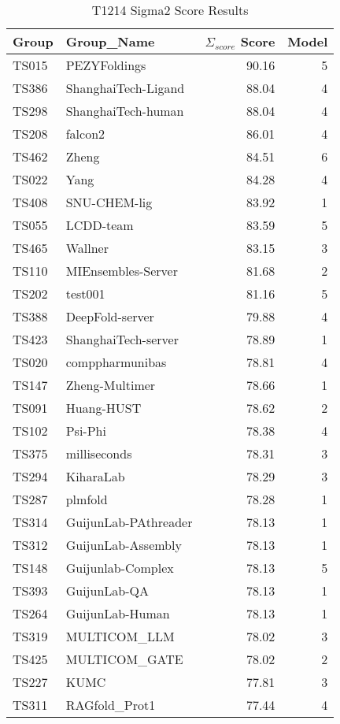 \begin{table*}[ht]
\caption{T1214 Sigma2 Score Results}
\label{tab:T1214_Sigma_score_split}
\scriptsize
\begin{minipage}[t]{0.48\textwidth}
\centering
\begin{tabular}{llrr}
\toprule
Group & Group\_Name & $\Sigma_{score}$ Score & Model \\ 
\midrule
TS015 & PEZYFoldings & 90.16 & 5 \\ 
TS386 & ShanghaiTech-Ligand & 88.04 & 4 \\ 
TS298 & ShanghaiTech-human & 88.04 & 4 \\ 
TS208 & falcon2 & 86.01 & 4 \\ 
TS462 & Zheng & 84.51 & 6 \\ 
TS022 & Yang & 84.28 & 4 \\ 
TS408 & SNU-CHEM-lig & 83.92 & 1 \\ 
TS055 & LCDD-team & 83.59 & 5 \\ 
TS465 & Wallner & 83.15 & 3 \\ 
TS110 & MIEnsembles-Server & 81.68 & 2 \\ 
TS202 & test001 & 81.16 & 5 \\ 
TS388 & DeepFold-server & 79.88 & 4 \\ 
TS423 & ShanghaiTech-server & 78.89 & 1 \\ 
TS020 & comppharmunibas & 78.81 & 4 \\ 
TS147 & Zheng-Multimer & 78.66 & 1 \\ 
TS091 & Huang-HUST & 78.62 & 2 \\ 
TS102 & Psi-Phi & 78.38 & 4 \\ 
TS375 & milliseconds & 78.31 & 3 \\ 
TS294 & KiharaLab & 78.29 & 3 \\ 
TS287 & plmfold & 78.28 & 1 \\ 
TS314 & GuijunLab-PAthreader & 78.13 & 1 \\ 
TS312 & GuijunLab-Assembly & 78.13 & 1 \\ 
TS148 & Guijunlab-Complex & 78.13 & 5 \\ 
TS393 & GuijunLab-QA & 78.13 & 1 \\ 
TS264 & GuijunLab-Human & 78.13 & 1 \\ 
TS319 & MULTICOM\_LLM & 78.02 & 3 \\ 
TS425 & MULTICOM\_GATE & 78.02 & 2 \\ 
TS227 & KUMC & 77.81 & 3 \\ 
TS311 & RAGfold\_Prot1 & 77.44 & 4 \\ 

\end{tabular}
\end{minipage}
\end{table*}
